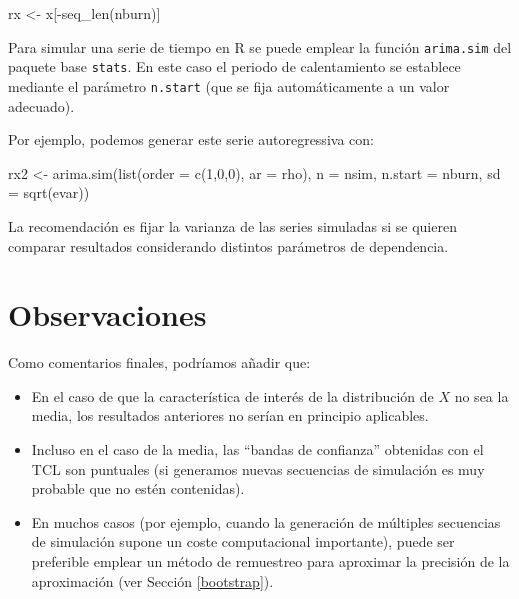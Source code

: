 \documentclass[
]{book}
\newenvironment{Shaded}{\begin{snugshade}}{\end{snugshade}}
\newcommand{\AttributeTok}[1]{\textcolor[rgb]{0.77,0.63,0.00}{#1}}
\newcommand{\DecValTok}[1]{\textcolor[rgb]{0.00,0.00,0.81}{#1}}
\newcommand{\FunctionTok}[1]{\textcolor[rgb]{0.00,0.00,0.00}{#1}}
\newcommand{\NormalTok}[1]{#1}
\newcommand{\OtherTok}[1]{\textcolor[rgb]{0.56,0.35,0.01}{#1}}
\newcommand{\SpecialCharTok}[1]{\textcolor[rgb]{0.00,0.00,0.00}{#1}}
\theoremstyle{break}
\theoremstyle{definition}
\theoremstyle{definition}
\theoremstyle{definition}
\theoremstyle{definition}
\theoremstyle{remark}
\begin{document}
\begin{Shaded}
\begin{Highlighting}[]
\NormalTok{rx }\OtherTok{\textless{}{-}}\NormalTok{ x[}\SpecialCharTok{{-}}\FunctionTok{seq\_len}\NormalTok{(nburn)]}
\end{Highlighting}
\end{Shaded}

Para simular una serie de tiempo en R se puede emplear la función \texttt{arima.sim} del paquete base \texttt{stats}.
En este caso el periodo de calentamiento se establece mediante el parámetro \texttt{n.start} (que se fija automáticamente a un valor adecuado).

Por ejemplo, podemos generar este serie autoregressiva con:

\begin{Shaded}
\begin{Highlighting}[]
\NormalTok{rx2 }\OtherTok{\textless{}{-}} \FunctionTok{arima.sim}\NormalTok{(}\FunctionTok{list}\NormalTok{(}\AttributeTok{order =} \FunctionTok{c}\NormalTok{(}\DecValTok{1}\NormalTok{,}\DecValTok{0}\NormalTok{,}\DecValTok{0}\NormalTok{), }\AttributeTok{ar =}\NormalTok{ rho), }\AttributeTok{n =}\NormalTok{ nsim, }\AttributeTok{n.start =}\NormalTok{ nburn, }\AttributeTok{sd =} \FunctionTok{sqrt}\NormalTok{(evar))}
\end{Highlighting}
\end{Shaded}

La recomendación es fijar la varianza de las series simuladas si se quieren comparar
resultados considerando distintos parámetros de dependencia.

\hypertarget{observaciones}{%
\section{Observaciones}\label{observaciones}}

Como comentarios finales, podríamos añadir que:

\begin{itemize}
\item
  En el caso de que la característica de interés de la
  distribución de \(X\) no sea la media, los resultados anteriores
  no serían en principio aplicables.
\item
  Incluso en el caso de la media, las ``bandas de confianza''
  obtenidas con el TCL son puntuales (si generamos nuevas
  secuencias de simulación es muy probable que no
  estén contenidas).
\item
  En muchos casos (por ejemplo, cuando la generación de múltiples secuencias de
  simulación supone un coste computacional importante),
  puede ser preferible emplear un método de remuestreo para aproximar
  la precisión de la aproximación (ver Sección \ref{bootstrap}).
\end{itemize}
\end{document}

